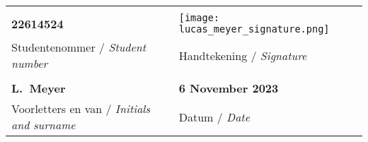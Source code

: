 \vfill

\noindent \begin{tabularx}{1.0\linewidth}{|L|L|}
    \hline
	& \\[-10pt]
    \textbf{22614524} & \texttt{[image: lucas\_meyer\_signature.png]} \\
    {Studentenommer / \textit{Student number}} & {Handtekening / \textit{Signature}} \\
    \hline
    & \\[-10pt]
    \textbf{L.\ Meyer} & \textbf{6 November 2023} \\
    {Voorletters en van / \textit{Initials and surname}} & {Datum / \textit{Date}} \\
    \hline
\end{tabularx}

\vspace{15pt}

